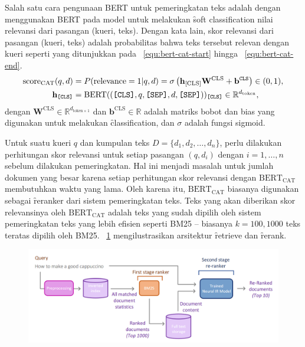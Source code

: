 		Salah satu cara pengunaan BERT untuk pemeringkatan teks adalah dengan menggunakan BERT pada
		model untuk melakukan \f{soft classification} nilai relevansi dari pasangan (kueri, teks). Dengan kata lain, skor relevansi dari pasangan (kueri, teks) adalah probabilitas bahwa teks tersebut relevan dengan kueri seperti yang ditunjukkan pada \equ~\ref{equ:bert-cat-start} hingga \equ~\ref{equ:bert-cat-end}.
		\begin{align}
			\label{equ:bert-cat-start}
			\text{score}_{\text{CAT}}(q,d) &= P(\text{relevance} = 1 | q, d) = \sigma\left(  \mathbf{h}_{\text{[CLS]}} \mathbf{W}^{\text{CLS}}+\mathbf{b}^{\texttt{CLS}} \right) \in (0,1), \\
			\label{equ:bert-cat-end}
			\mathbf{h}_{\text{\texttt{[CLS]}}} &= \text{BERT}((\text{\texttt{[CLS]}}, q, \text{\texttt{[SEP]}}, d, \text{\texttt{[SEP]}}))_{\text{\texttt{[CLS]}}} \in \mathbb{R}^{d_{\text{token}}},
		\end{align}
		dengan $\mathbf{W}^{\text{CLS}} \in \mathbb{R}^{d_{\text{token} \times 1}}$ dan $\mathbf{b}^{\text{CLS}} \in \mathbb{R}$ adalah matriks bobot dan bias yang digunakan untuk melakukan \f{classification}, dan $\sigma$ adalah fungsi sigmoid.

		Untuk suatu kueri $q$ dan kumpulan teks $D = \{d_1, d_2, \dots, d_n\}$, perlu dilakukan perhitungan skor relevansi untuk setiap pasangan $(q, d_i)$ dengan $i=1,\dots,n$ sebelum dilakukan pemeringkatan. Hal ini menjadi masalah untuk jumlah dokumen yang besar karena setiap perhitungan skor relevansi dengan $\text{BERT}_{\text{CAT}}$ membutuhkan waktu yang lama. Oleh karena itu, $\text{BERT}_{\text{CAT}}$ biasanya digunakan sebagai \f{reranker} dari sistem pemeringkatan teks. Teks yang akan diberikan skor relevansinya oleh $\text{BERT}_{\text{CAT}}$ adalah teks yang sudah dipilih oleh sistem pemeringkatan teks yang lebih efisien seperti {BM25} -- biasanya $k = 100, 1000$ teks teratas dipilih oleh {BM25}. \pic~\ref{fig:bert-cat-withbm25} mengilustrasikan arsitektur \f{retrieve} dan \f{rerank}.

		\begin{figure}[!ht]
			\centering
			\includegraphics[width=1\textwidth]{assets/pics/neural-ir.png}
			\label{fig:bert-cat-withbm25}
		\end{figure}

